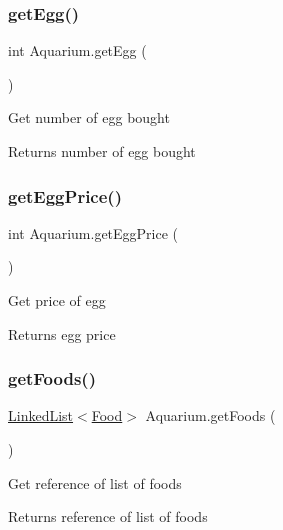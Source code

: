 \subsubsection{\texorpdfstring{get\+Egg()}{getEgg()}}
{\footnotesize\ttfamily int Aquarium.\+get\+Egg (\begin{DoxyParamCaption}{ }\end{DoxyParamCaption})\hspace{0.3cm}{\ttfamily [inline]}}

Get number of egg bought \begin{DoxyReturn}{Returns}
number of egg bought 
\end{DoxyReturn}
\mbox{\label{class_aquarium_ad5e2f2db9e09447fcb89ca3a558a69ce}} 
\subsubsection{\texorpdfstring{get\+Egg\+Price()}{getEggPrice()}}
{\footnotesize\ttfamily int Aquarium.\+get\+Egg\+Price (\begin{DoxyParamCaption}{ }\end{DoxyParamCaption})\hspace{0.3cm}{\ttfamily [inline]}}

Get price of egg \begin{DoxyReturn}{Returns}
egg price 
\end{DoxyReturn}
\mbox{\label{class_aquarium_ac47310f32364a37c85349445034ea802}} 
\subsubsection{\texorpdfstring{get\+Foods()}{getFoods()}}
{\footnotesize\ttfamily \mbox{\hyperlink{class_linked_list}{Linked\+List}}$<$\mbox{\hyperlink{class_food}{Food}}$>$ Aquarium.\+get\+Foods (\begin{DoxyParamCaption}{ }\end{DoxyParamCaption})\hspace{0.3cm}{\ttfamily [inline]}}

Get reference of list of foods \begin{DoxyReturn}{Returns}
reference of list of foods 
\end{DoxyReturn}
\mbox{\label{class_aquarium_a275fe429b5baa09995d06e02e82d068e}} 
